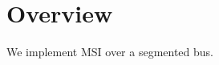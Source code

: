 \documentclass{article}
\begin{document}
\section*{Overview}

We implement MSI over a segmented bus. 
\end{document}
